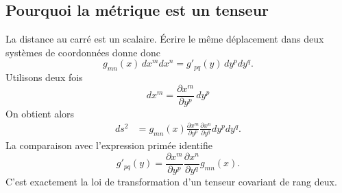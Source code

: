 \begin{classroomqa}
\end{classroomqa}

\begin{classroomqa}
\end{classroomqa}

\begin{classroomqa}
\end{classroomqa}

\subsection{Pourquoi la métrique est un tenseur}

La distance au carré est un scalaire. Écrire le même déplacement dans deux systèmes de coordonnées donne donc
\begin{equation}
 g_{mn}(x)\,dx^m dx^n
 =
 g'_{pq}(y)\,dy^pdy^q.
\label{eq:length-invariance}
\end{equation}
Utilisons deux fois
\begin{equation}
 dx^m=\frac{\partial x^m}{\partial y^p}\,dy^p
\end{equation}
On obtient alors
\begin{align}
 ds^2
 &=
 g_{mn}(x)
 \frac{\partial x^m}{\partial y^p}
 \frac{\partial x^n}{\partial y^q}
 dy^pdy^q.
\label{eq:metric-transform-derivation}
\end{align}
La comparaison avec l’expression primée identifie
\begin{equation}
 g'_{pq}(y)
 =
 \frac{\partial x^m}{\partial y^p}
 \frac{\partial x^n}{\partial y^q}
 g_{mn}(x).
\label{eq:metric-transformation}
\end{equation}
C’est exactement la loi de transformation d’un tenseur covariant de rang deux.

